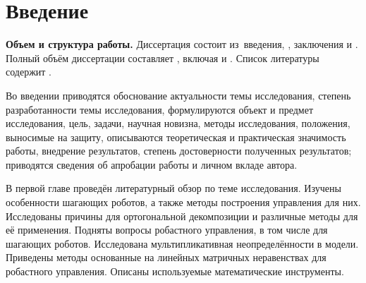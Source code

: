 \chapter*{Введение}                         %

\newcommand{\actuality}{\textbf{\actualityTXT}}
\newcommand{\progress}{\textbf{\progressTXT}}
\newcommand{\objectsubject}{\textbf{\objectsubjectTXT}}
\newcommand{\aimtasks}{\textbf{\aimtasksTXT}}
\newcommand{\methods}{\textbf{\methodsTXT}}
\newcommand{\defpositions}{\textbf{\defpositionsTXT}}
\newcommand{\compliances}{\textbf{\complianceTXT}}
\newcommand{\novelty}{\textbf{\noveltyTXT}}
\newcommand{\probation}{\textbf{\probationTXT}}
\newcommand{\influence}{\textbf{\influenceTXT}}
\newcommand{\reliability}{\textbf{\reliabilityTXT}}
\newcommand{\publications}{\textbf{\publicationsTXT}}
\newcommand{\contribution}{\textbf{\contributionTXT}}


\textbf{Объем и структура работы.} Диссертация состоит из~введения,
,
заключения и
.
%
Полный объём диссертации составляет
, включая
 и
.
Список литературы содержит
.

Во введении приводятся обоснование актуальности темы исследования, степень разработанности темы исследования, формулируются объект и предмет исследования, цель, задачи, научная новизна, методы исследования, положения, выносимые на защиту, описываются теоретическая и практическая значимость работы, внедрение результатов, степень достоверности полученных результатов; приводятся сведения об апробации работы и личном вкладе автора.

В первой главе проведён литературный обзор по теме исследования. Изучены особенности шагающих роботов, а также методы построения управления для них. Исследованы причины для ортогональной декомпозиции и различные методы для её применения. Подняты вопросы робастного управления, в том числе для шагающих роботов. Исследована мультипликативная неопределённости в модели. Приведены методы основанные на линейных матричных неравенствах для робастного управления. Описаны используемые математические инструменты.

